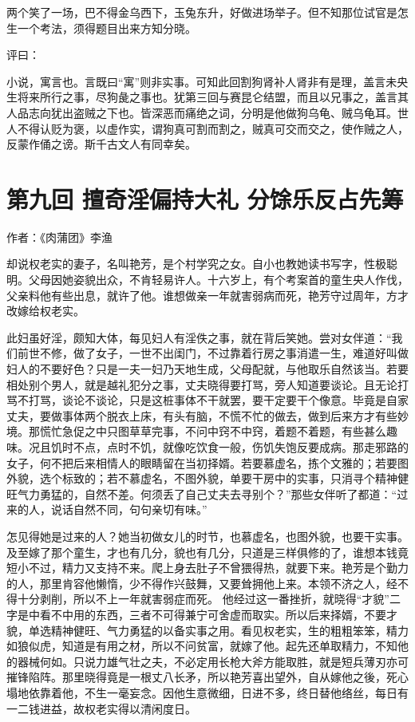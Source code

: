 \documentclass[a4paper,12pt,UTF8,twoside]{ctexbook}
\begin{document}
两个笑了一场，巴不得金乌西下，玉兔东升，好做进场举子。但不知那位试官是怎生一个考法，须得题目出来方知分晓。

评曰：

小说，寓言也。言既曰“寓”则非实事。可知此回割狗肾补人肾非有是理，盖言未央生将来所行之事，尽狗彘之事也。犹第三回与赛昆仑结盟，而且以兄事之，盖言其人品志向犹出盗贼之下也。皆深恶而痛绝之词，分明是他做狗乌龟、贼乌龟耳。世人不得认贬为褒，以虚作实，谓狗真可割而割之，贼真可交而交之，使作贼之人，反蒙作俑之谤。斯千古文人有同幸矣。

\chapter{第九回 擅奇淫偏持大礼 分馀乐反占先筹}

作者：《肉蒲团》李渔

却说权老实的妻子，名叫艳芳，是个村学究之女。自小也教她读书写字，性极聪明。父母因她姿貌出众，不肯轻易许人。十六岁上，有个考案首的童生央人作伐，父亲料他有些出息，就许了他。谁想做亲一年就害弱病而死，艳芳守过周年，方才改嫁给权老实。

此妇虽好淫，颇知大体，每见妇人有淫佚之事，就在背后笑她。尝对女伴道：“我们前世不修，做了女子，一世不出闺门，不过靠着行房之事消遣一生，难道好叫做妇人的不要好色？只是一夫一妇乃天地生成，父母配就，与他取乐自然该当。若要相处别个男人，就是越礼犯分之事，丈夫晓得要打骂，旁人知道要谈论。且无论打骂不打骂，谈论不谈论，只是这桩事体不干就罢，要干定要干个像意。毕竟是自家丈夫，要做事体两个脱衣上床，有头有脑，不慌不忙的做去，做到后来方才有些妙境。那慌忙急促之中只图草草完事，不问中窍不中窍，着题不着题，有些甚么趣味。况且饥时不点，点时不饥，就像吃饮食一般，伤饥失饱反要成病。那走邪路的女子，何不把后来相情人的眼睛留在当初择婿。若要慕虚名，拣个文雅的；若要图外貌，选个标致的；若不慕虚名，不图外貌，单要干房中的实事，只消寻个精神健旺气力勇猛的，自然不差。何须丢了自己丈夫去寻别个？”那些女伴听了都道：“过来的人，说话自然不同，句句亲切有味。”

怎见得她是过来的人？她当初做女儿的时节，也慕虚名，也图外貌，也要干实事。及至嫁了那个童生，才也有几分，貌也有几分，只道是三样俱修的了，谁想本钱竟短小不过，精力又支持不来。爬上身去肚子不曾猥得热，就要下来。艳芳是个勤力的人，那里肯容他懒惰，少不得作兴鼓舞，又要耸拥他上来。本领不济之人，经不得十分剥削，所以不上一年就害弱症而死。 他经过这一番挫折，就晓得“才貌”二字是中看不中用的东西，三者不可得兼宁可舍虚而取实。所以后来择婿，不要才貌，单选精神健旺、气力勇猛的以备实事之用。看见权老实，生的粗粗笨笨，精力如狼似虎，知道是有用之材，所以不问贫富，就嫁了他。起先还单取精力，不知他的器械何如。只说力雄气壮之夫，不必定用长枪大斧方能取胜，就是短兵薄刃亦可摧锋陷阵。那里晓得竟是一根丈八长矛，所以艳芳喜出望外，自从嫁他之後，死心塌地依靠着他，不生一毫妄念。因他生意微细，日进不多，终日替他络丝，每日有一二钱进益，故权老实得以清闲度日。
\end{document}
